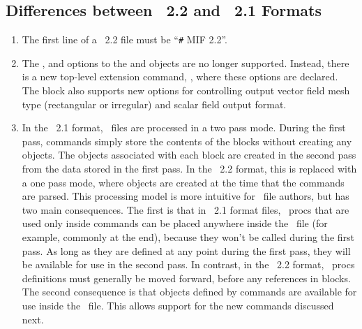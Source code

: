 \subsection{Differences between \MIF~2.2 and \MIF~2.1 Formats}\label{sec:mif22diffs}
\begin{enumerate}
\item The first line of a \MIF~2.2 file must be ``\verb+#+ MIF 2.2''.
\item The ,  and
  options to the 
 and  objects are no longer supported.  Instead,
 there is a new top-level extension command, , where
 these options are declared.  The  block also
 supports new options for controlling output vector field mesh type
 (rectangular or irregular) and scalar field output format.
\item In the \MIF~2.1 format, \MIF\ files are
 processed in a two pass mode.  During the first pass, 
 commands simply store the contents of the  blocks without
 creating any  objects.  The  objects
 associated with each  block are created in the second pass
 from the data stored in the first pass.  In the \MIF~2.2 format, this is
 replaced with a one pass mode, where  objects are created
 at the time that the  commands are parsed.  This processing
 model is more intuitive for \MIF\ file authors, but has two main
 consequences.  The first is that in \MIF~2.1 format files, \Tcl\ procs that
 are used only inside  commands can be placed anywhere inside
 the \MIF\ file (for example, commonly at the end), because they won't be
 called during the first pass.  As long as they are defined at any point
 during the first pass, they will be available for use in the second
 pass.  In contrast, in the \MIF~2.2 format, \Tcl\ procs definitions must
 generally be moved forward, before any references in 
 blocks.  The second consequence is that  objects defined by
  commands are available for use inside the \MIF\ file.  This
 allows support for the new commands discussed next.
\end{enumerate}

